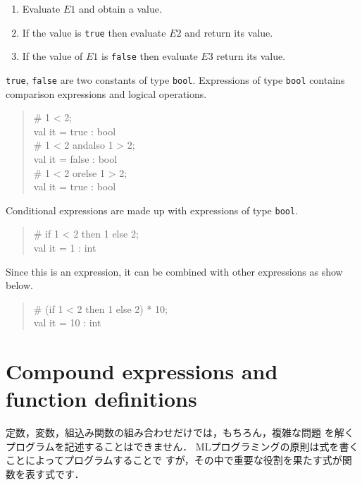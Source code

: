 \documentclass{jbook}
\newif\ifjp
\newcommand{\txt}[2]{#2}
\newenvironment{program}{\begin{quote}\begin{tt}}%
                        {\end{tt}\end{quote}}
\begin{document}
\begin{enumerate}
\item Evaluate $E1$ and obtain a value.
\item If the value is {\tt true} then evaluate $E2$ and return its value.
\item If the value of $E1$ is {\tt false} then evaluate $E3$ return its value.
\end{enumerate}
	{\tt true}, {\tt false} are two constants of type {\tt bool}.
	Expressions of type {\tt bool} contains comparison expressions
and logical operations.
\begin{program}
\# 1 < 2;\\
val it = true : bool\\
\# 1 < 2 andalso 1 > 2;\\
val it = false : bool\\
\# 1 < 2 orelse 1 > 2;\\
val it = true : bool
\end{program}
	Conditional expressions are made up with expressions of type
{\tt bool}.
\begin{program}
\# if 1 < 2 then 1 else 2;\\
val it = 1 : int
\end{program}
	Since this is an expression, it can be combined with other
expressions as show below.
\begin{program}
\# (if 1 < 2 then 1 else 2) * 10;\\
val it = 10 : int
\end{program}
\fi%


\section{
\txt{複雑な式と関数}
{Compound expressions and function definitions}
}
\label{sec:tutorialFunction}

\ifjp%
	定数，変数，組込み関数の組み合わせだけでは，もちろん，複雑な問題
を解くプログラムを記述することはできません． 
	MLプログラミングの原則は式を書くことによってプログラムすることで
すが，その中で重要な役割を果たす式が関数を表す式です．
\end{document}
